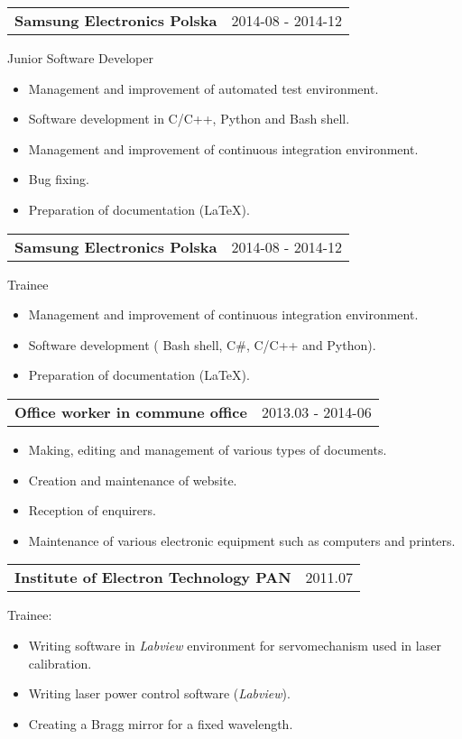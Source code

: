 \documentclass{article}
\begin{document}
\begin{tabular}{@{} m{} R{0.37\textwidth} }
\textbf{Samsung Electronics Polska}	& {2014-08 - 2014-12} 
\end{tabular}
Junior Software Developer\\
\begin{itemize}
	\item Management and improvement of automated test environment.
	\item Software development in C/C++, Python and Bash shell.
	\item Management and improvement of continuous integration environment.
	\item Bug fixing.
	\item Preparation of documentation (\LaTeX).
\end{itemize}
\begin{tabular}{@{} m{} R{0.37\textwidth} }
	{ \textbf{Samsung Electronics Polska}}	& {2014-08 - 2014-12} 
\end{tabular}
Trainee\\
\begin{itemize}
	\item Management and improvement of continuous integration environment.
	\item Software development ( Bash shell, C\#, C/C++ and Python).
	\item Preparation of documentation (\LaTeX). 
\end{itemize}
\begin{tabular}{@{} m{} R{0.37\textwidth} }
\textbf{Office worker in commune office}	& {2013.03 - 2014-06} 
\end{tabular}
\begin{itemize}
	\item Making, editing and management of various types of documents.
	\item Creation and maintenance of website.
	\item Reception of enquirers.
	\item Maintenance of various electronic equipment such as computers and printers.
\end{itemize}

\begin{tabular}{@{} m{} R{0.47\textwidth} }
\textbf{Institute of Electron Technology PAN}	& {2011.07} 
\end{tabular}
Trainee:
\begin{itemize}
	\item Writing software in \emph{Labview} environment for servomechanism used in laser calibration.
	\item Writing laser power control software (\emph{Labview}).
	\item Creating a Bragg mirror for a fixed wavelength.
\end{itemize}
\end{document}
